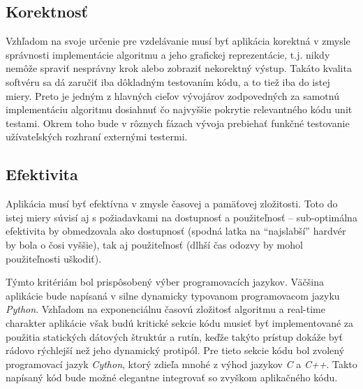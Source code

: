 \documentclass{article}
\begin{document}
\subsection{Korektnosť}\label{subsec:correctness}
Vzhľadom na svoje určenie pre vzdelávanie musí byť aplikácia korektná v zmysle správnosti implementácie algoritmu a jeho grafickej reprezentácie, t.j. nikdy nemôže spraviť nesprávny krok alebo zobraziť nekorektný výstup.
Takáto kvalita softvéru sa dá zaručiť iba dôkladným testovaním kódu, a to tiež iba do istej miery. Preto je jedným z hlavných cieľov vývojárov zodpovedných za samotnú implementáciu algoritmu dosiahnuť čo najvyššie pokrytie relevantného kódu unit testami. Okrem toho bude v rôznych fázach vývoja prebiehať funkčné testovanie užívateľských rozhraní externými testermi.

\subsection{Efektivita}\label{subsec:effectivity}
Aplikácia musí byť efektívna v zmysle časovej a pamäťovej zložitosti. Toto do istej miery súvisí aj s požiadavkami na dostupnosť a použiteľnosť – sub-optimálna efektivita by obmedzovala ako dostupnosť (spodná latka na “najslabší” hardvér by bola o čosi vyššie), tak aj použiteľnosť (dlhší čas odozvy by mohol použiteľnosti uškodiť).

Týmto kritériám bol prispôsobený výber programovacích jazykov. Väčšina aplikácie bude napísaná v silne dynamicky typovanom programovacom jazyku \emph{Python}. Vzhľadom na exponenciálnu časovú zložitosť algoritmu a real-time charakter aplikácie však budú kritické sekcie kódu musieť byť implementované za použitia statických dátových štruktúr a rutín, keďže takýto prístup dokáže byť rádovo rýchlejší než jeho dynamický protipól. Pre tieto sekcie kódu bol zvolený programovací jazyk \emph{Cython}, ktorý zdieľa mnohé z výhod jazykov \emph{C} a \emph{C++}. Takto napísaný kód bude možné elegantne integrovať so zvyškom aplikačného kódu.
\end{document}
